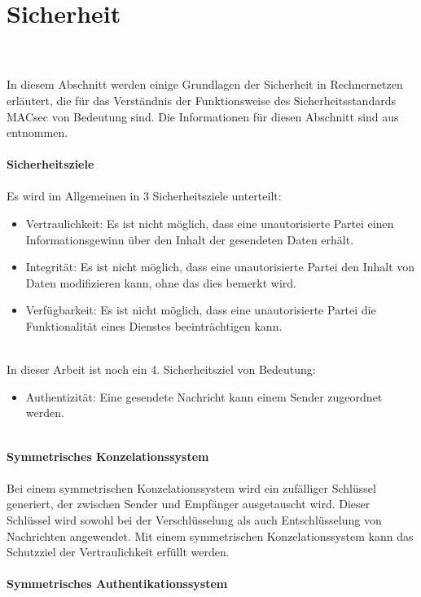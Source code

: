 \section{Sicherheit}\\
\\
In diesem Abschnitt werden einige Grundlagen der Sicherheit in Rechnernetzen erläutert, die für das Verständnis der Funktionsweise des Sicherheitsstandards MACsec von Bedeutung sind. Die Informationen für diesen Abschnitt sind aus \cite{pfitzmann2000sicherheit} entnommen.
\\
\\
\textbf{Sicherheitsziele}\\
\\
Es wird im Allgemeinen in 3 Sicherheitsziele unterteilt:
\begin{itemize}
\item Vertraulichkeit: Es ist nicht möglich, dass eine unautorisierte Partei einen Informationsgewinn über den Inhalt der gesendeten Daten erhält.
\item Integrität: Es ist nicht möglich, dass eine unautorisierte Partei den Inhalt von Daten modifizieren kann, ohne das dies bemerkt wird.
\item Verfügbarkeit: Es ist nicht möglich, dass eine unautorisierte Partei die Funktionalität eines Dienstes beeinträchtigen kann.
\end{itemize} \\
In dieser Arbeit ist noch ein 4. Sicherheitsziel von Bedeutung:
\begin{itemize}
\item Authentizität: Eine gesendete Nachricht kann einem Sender zugeordnet werden.\\
\end{itemize}
\\
\textbf{Symmetrisches Konzelationssystem}\\
\\
Bei einem symmetrischen Konzelationssystem wird ein zufälliger Schlüssel generiert, der zwischen Sender und Empfänger ausgetauscht wird. Dieser Schlüssel wird sowohl bei der Verschlüsselung als auch Entschlüsselung von Nachrichten angewendet. Mit einem symmetrischen Konzelationssystem kann das Schutzziel der Vertraulichkeit erfüllt werden. \\
\\
\textbf{Symmetrisches Authentikationssystem}\\
\\
